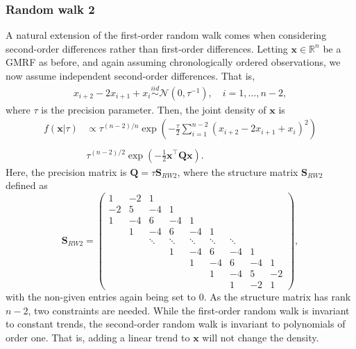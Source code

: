 \subsubsection{Random walk 2}
A natural extension of the first-order random walk comes when considering second-order differences rather than first-order differences. Letting $\pmb x\in\mathbb{R}^n$ be a GMRF as before, and again assuming chronologically ordered observations, we now assume independent second-order differences. That is,
\begin{align}
    x_{i+2} - 2x_{i+1} + x_i \overset{iid}{\sim}\mathcal{N}(0, \tau^{-1}), \quad i = 1,...,n-2,
\end{align}
where $\tau$ is the precision parameter. Then, the joint density of $\pmb x$ is
\begin{align*}
f(\pmb x|\tau) & \propto \tau^{(n-2)/n}\exp\left( -\frac{\tau}{2}\sum_{i=1}^{n-2}(x_{i+2} - 2x_{i+1} + x_{i})^2\right) \\\\
& \tau^{(n-2)/2}\exp \left(-\frac{1}{2}\pmb x^\top \pmb Q \pmb x\right). 
\end{align*}
Here, the precision matrix is $\pmb Q=\tau\pmb S_{RW2}$, where the structure matrix $\pmb S_{RW2}$ defined as
\begin{equation}
    \pmb S_{RW2} = \begin{pmatrix}
        1 & -2 & 1 &  &  &  &  &  &  \\
        -2 & 5 & -4 & 1 &  &  &  &  &  \\
        1 & -4 & 6 & -4 & 1 &  &  &  &  \\
         & 1 & -4 & 6 & -4 & 1 &  &  &  \\
         &  & \ddots & \ddots & \ddots & \ddots & \ddots &  &  \\
         &  &  & 1 & -4 & 6 & -4 & 1 &  \\
         &  &  &  & 1 & -4 & 6 & -4 & 1 \\
         &  &  &  &  & 1 & -4 & 5 & -2 \\
         &  &  &  &  &  & 1 & -2 & 1 
        \end{pmatrix},
\end{equation}
with the non-given entries again being set to $0$. As the structure matrix has rank $n-2$, two constraints are needed. While the first-order random walk is invariant to constant trends, the second-order random walk is invariant to polynomials of order one. That is, adding a linear trend to $\pmb x$ will not change the density. 

